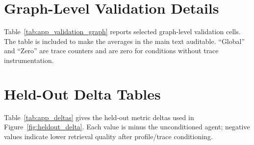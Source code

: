 \section{Graph-Level Validation Details}
Table~\ref{tab:app_validation_graph} reports selected graph-level validation cells. The table is included to make the averages in the main text auditable. ``Global'' and ``Zero'' are trace counters and are zero for conditions without trace instrumentation.
\begin{table}[h]
\centering
\caption{Graph-level validation details for representative controller variants.}
\label{tab:app_validation_graph}
\end{table}

\section{Held-Out Delta Tables}
Table~\ref{tab:app_deltas} gives the held-out metric deltas used in Figure~\ref{fig:heldout_delta}. Each value is \tb minus the unconditioned agent; negative values indicate lower retrieval quality after profile/trace conditioning.

